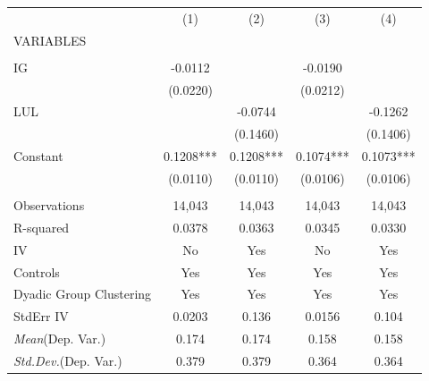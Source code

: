 \documentclass[]{article}
\begin{document}
\begin{tabular}{lcccc} \hline
 & (1) & (2) & (3) & (4) \\
VARIABLES &  &  &  &  \\ \hline
 &  &  &  &  \\
IG & -0.0112 &  & -0.0190 &  \\
 & (0.0220) &  & (0.0212) &  \\
LUL &  & -0.0744 &  & -0.1262 \\
 &  & (0.1460) &  & (0.1406) \\
Constant & 0.1208*** & 0.1208*** & 0.1074*** & 0.1073*** \\
 & (0.0110) & (0.0110) & (0.0106) & (0.0106) \\
 &  &  &  &  \\
Observations & 14,043 & 14,043 & 14,043 & 14,043 \\
R-squared & 0.0378 & 0.0363 & 0.0345 & 0.0330 \\
IV & No & Yes & No & Yes \\
Controls & Yes & Yes & Yes & Yes \\
Dyadic Group Clustering & Yes & Yes & Yes & Yes \\
StdErr IV & 0.0203 & 0.136 & 0.0156 & 0.104 \\
\textit{Mean}(Dep. Var.) & 0.174 & 0.174 & 0.158 & 0.158 \\
 \textit{Std.Dev.}(Dep. Var.) & 0.379 & 0.379 & 0.364 & 0.364 \\ \hline
\end{tabular}
\end{document}
